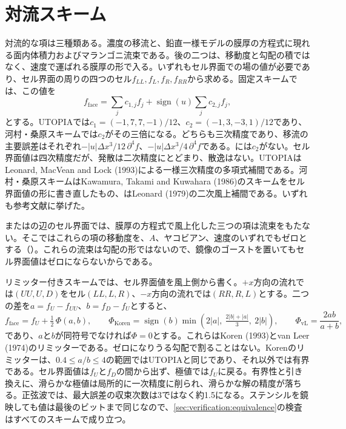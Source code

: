 \section{対流スキーム}
\label{sec:disc:convection}

対流的な項は三種類ある。濃度の移流と、鉛直一様モデルの膜厚の方程式に現れる面内体積力およびマランゴニ流束である。後の二つは、移動度と勾配の積ではなく、速度で運ばれる膜厚の形で入る。いずれもセル界面での場の値が必要であり、セル界面の周りの四つのセル$f_{LL}, f_L, f_R, f_{RR}$から求める。固定スキームでは、この値を
%
\begin{equation}
  f_{\text{face}} = \sum_j c_{1,j} f_j + \operatorname{sign}(u)\sum_j c_{2,j} f_j ,
  \label{eq:disc:face}
\end{equation}
%
とする。UTOPIAでは$c_1 = (-1, 7, 7, -1)/12$、$c_2 = (-1, 3, -3, 1)/12$であり、河村・桑原スキームでは$c_2$がその三倍になる。どちらも三次精度であり、移流の主要誤差はそれぞれ$-|u|\Delta x^3/12\,\partial^4 f$、$-|u|\Delta x^3/4\,\partial^4 f$である。には$c_2$がない。セル界面値は四次精度だが、発散は二次精度にとどまり、散逸はない。UTOPIAはLeonard, MacVean and Lock (1993)による一様三次精度の多項式補間である。河村・桑原スキームはKawamura, Takami and Kuwahara (1986)のスキームをセル界面値の形に書き直したもの、はLeonard (1979)の二次風上補間である。いずれも参考文献に挙げた。

またはの辺のセル界面では、膜厚の方程式で風上化した三つの項は流束をもたない。そこではこれらの項の移動度を、$A$、ヤコビアン、速度のいずれでもゼロとする（）。これらの流束は勾配の形ではないので、鏡像のゴーストを置いてもセル界面値はゼロにならないからである。

リミッター付きスキームでは、セル界面値を風上側から書く。$+x$方向の流れでは$(UU, U, D)$をセル$(LL, L, R)$、$-x$方向の流れでは$(RR, R, L)$とする。二つの差を$a = f_U - f_{UU}$、$b = f_D - f_U$とすると、
%
\begin{equation}
  f_{\text{face}} = f_U + \tfrac12\,\Phi(a, b), \qquad
  \Phi_{\text{Koren}} = \operatorname{sign}(b)\min\!\left(2|a|,\ \tfrac{2|b| + |a|}{3},\ 2|b|\right), \qquad
  \Phi_{\text{vL}} = \frac{2ab}{a + b},
  \label{eq:disc:limited}
\end{equation}
%
であり、$a$と$b$が同符号でなければ$\Phi = 0$とする。これらはKoren (1993)とvan Leer (1974)のリミッターである。ゼロになりうる勾配で割ることはない。Korenのリミッターは、$0.4 \le a/b \le 4$の範囲ではUTOPIAと同じであり、それ以外では有界である。セル界面値は$f_U$と$f_D$の間から出ず、極値では$f_U$に戻る。有界性と引き換えに、滑らかな極値は局所的に一次精度に削られ、滑らかな解の精度が落ちる。正弦波では、最大誤差の収束次数は3ではなく約1.5になる。ステンシルを鏡映しても値は最後のビットまで同じなので、\cref{sec:verification:equivalence}の検査はすべてのスキームで成り立つ。

